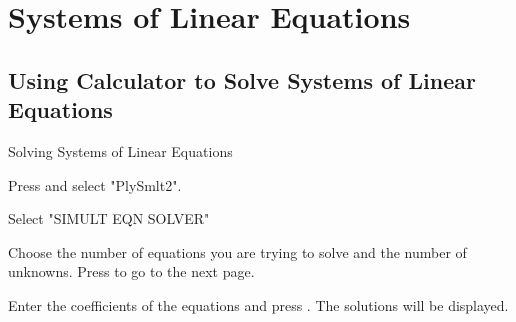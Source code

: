\documentclass[11pt,a4paper]{book}
\begin{document}
\newpage

\section{Systems of Linear Equations }

\subsection{Using Calculator to Solve Systems of Linear Equations}

\begin{GC}{Solving Systems of Linear Equations}
\begin{steps}
\item Press  and select "PlySmlt2".
\item Select "SIMULT EQN SOLVER"
\item Choose the number of equations you are trying to solve and the number of unknowns. Press  to go to the next page.
\item Enter the coefficients of the equations and press . The solutions will be displayed.
\end{steps}
\end{GC}
\end{document}
